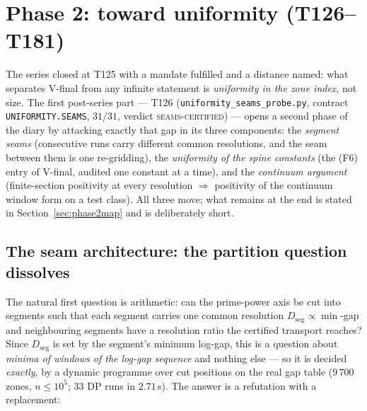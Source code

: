 \documentclass[11pt,a4paper]{article}
\begin{document}
\section{Phase 2: toward uniformity (T126--T181)}\label{sec:phase2}
\noindent The series closed at T125 with a mandate fulfilled and a distance named: what separates
V-final from any infinite statement is \emph{uniformity in the zone index}, not size. The first
post-series part --- T126 (\texttt{uniformity\_seams\_probe.py}, contract \texttt{UNIFORMITY.SEAMS},
$31/31$, verdict \textsc{seams-certified}) --- opens a second phase of the diary by attacking exactly
that gap in its three components: the \emph{segment seams} (consecutive runs carry different common
resolutions, and the seam between them is one re-gridding), the \emph{uniformity of the spine
constants} (the (F6) entry of V-final, audited one constant at a time), and the \emph{continuum
argument} (finite-section positivity at every resolution $\Rightarrow$ positivity of the continuum
window form on a test class). All three move; what remains at the end is stated in
Section~\ref{sec:phase2map} and is deliberately short.

\subsection{The seam architecture: the partition question dissolves}
The natural first question is arithmetic: can the prime-power axis be cut into segments such that
each segment carries one common resolution $D_{\mathrm{seg}}\propto\min$-gap and neighbouring
segments have a resolution ratio the certified transport reaches? Since $D_{\mathrm{seg}}$ is set by
the segment's minimum log-gap, this is a question about \emph{minima of windows of the log-gap
sequence} and nothing else --- so it is decided \emph{exactly}, by a dynamic programme over cut
positions on the real gap table ($9\,700$ zones, $n\le10^{5}$; $33$ DP runs in $2.71$\,s). The answer
is a refutation with a replacement:
\end{document}
